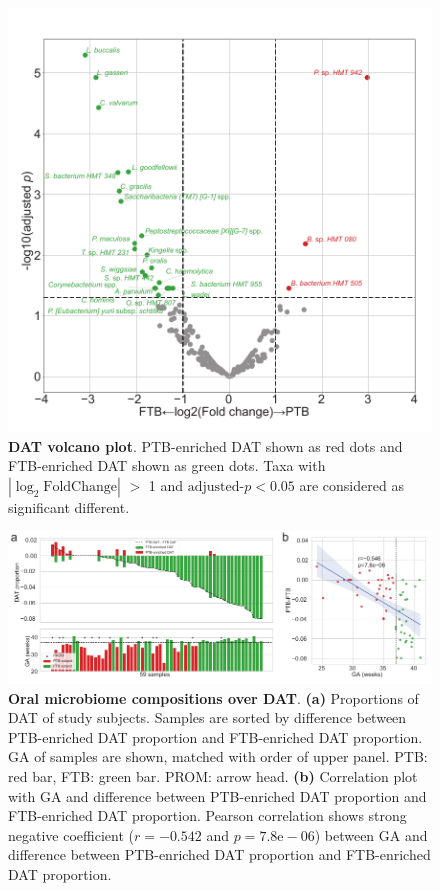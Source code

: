 \documentclass[11pt, a4paper, onecolumn, oneside]{report}
\begin{document}
            \begin{figure}[p]
                \centering
                \includegraphics[width=12 cm]{Figures/PTB/Fig1-DAT.pdf}
                \caption[DAT volcano plot]{\textbf{DAT volcano plot}. PTB-enriched DAT shown as red dots and FTB-enriched DAT shown as green dots. Taxa with $| \log _2 \textrm{FoldChange} |$ $>$ 1 and $\textrm{adjusted-} p < 0.05$ are considered as significant different.}
                \label{fig:PTB-DAT}
            \end{figure}
            \clearpage

            \begin{figure}[p]
                \centering
                \includegraphics[width=15 cm]{Figures/PTB/Fig2-Composition.pdf}
                \caption[Oral microbiome compositions over DAT]{\textbf{Oral microbiome compositions over DAT}. \textbf{(a)} Proportions of DAT of study subjects. Samples are sorted by difference between PTB-enriched DAT proportion and FTB-enriched DAT proportion. GA of samples are shown, matched with order of upper panel. PTB: red bar, FTB: green bar. PROM: arrow head. \textbf{(b)} Correlation plot with GA and difference between PTB-enriched DAT proportion and FTB-enriched DAT proportion. Pearson correlation shows strong negative coefficient ($r = -0.542$ and $p = 7.8\textrm{e}-06$) between GA and difference between PTB-enriched DAT proportion and FTB-enriched DAT proportion.}
                \label{fig:PTB-composition}
            \end{figure}
            \clearpage
\end{document}
